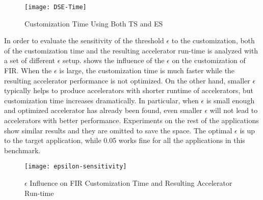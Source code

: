 \begin{figure}[htb]
    \centering
    \texttt{[image: DSE-Time]}
    \caption{Customization Time Using Both TS and ES}
    \label{fig:DSE-Time}
\end{figure}


In order to evaluate the sensitivity of the threshold $\epsilon$ to the customization, both of the customization time and the resulting accelerator run-time is analyzed with a set of different $\epsilon$ setup.  shows the influence of the $\epsilon$ on the customization of FIR. When the $\epsilon$ is large, the customization time is much faster while the resulting accelerator performance is not optimized. On the other hand, smaller $\epsilon$ typically helps to produce accelerators with shorter runtime of accelerators, but customization time increases dramatically. In particular, when $\epsilon$ is small enough and optimized accelerator has already been found, even smaller $\epsilon$ will not lead to accelerators with better performance. Experiments on the rest of the applications show similar results and they are omitted to save the space. The optimal $\epsilon$ is up to the target application, while 0.05 works fine for all the applications in this benchmark.

\begin{figure}[htb]
    \centering
    \texttt{[image: epsilon-sensitivity]}
    \caption{$\epsilon$ Influence on FIR Customization Time and Resulting Accelerator Run-time}
    \label{fig:epsilon-sensitivity}
\end{figure}
 
